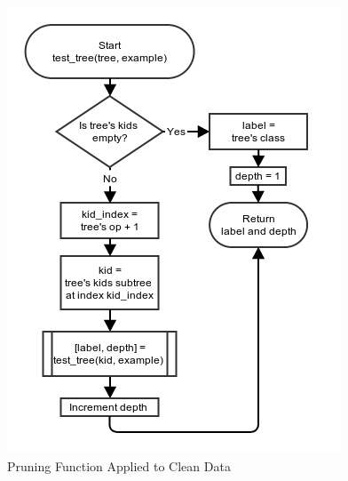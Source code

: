 \documentclass[11pt,a4paper]{article}
\begin{document}
\begin{figure}[p]
		\includegraphics[width=\textwidth, height=\textheight]{images/flow_chart/test_tree.png}
     	\caption{Pruning Function Applied to Clean Data}
     	\label{fig:pruningClean}
\end{figure}
\end{document}
